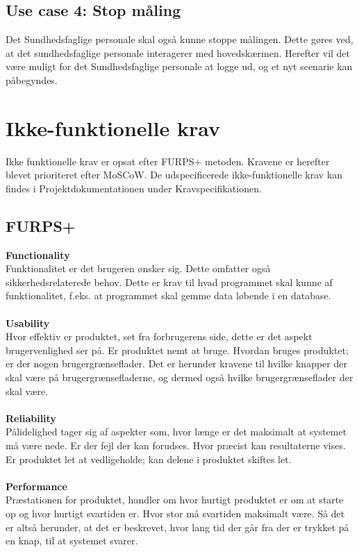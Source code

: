 \subsection{Use case 4: Stop måling}
Det Sundhedsfaglige personale skal også kunne stoppe målingen. Dette gøres ved, at det sundhedsfaglige personale interagerer med hovedskærmen. Herefter vil det være muligt for det Sundhedsfaglige personale at logge ud, og et nyt scenarie kan påbegyndes.
\section{Ikke-funktionelle krav}
Ikke funktionelle krav er opsat efter FURPS+ metoden. Kravene er herefter blevet prioriteret efter MoSCoW. De udspecificerede ikke-funktionelle krav kan findes i Projektdokumentationen under Kravspecifikationen.
\subsection{FURPS+}
\textbf{Functionality}\\
Funktionalitet er det brugeren ønsker sig. Dette omfatter også sikkerhedsrelaterede behov. Dette er krav til hvad programmet skal kunne af funktionalitet, f.eks. at programmet skal gemme data løbende i en database.\\\\
\textbf{Usability}\\
Hvor effektiv er produktet, set fra forbrugerens side, dette er det aspekt brugervenlighed ser på. Er produktet nemt at bruge. Hvordan bruges produktet; er der nogen brugergrænseflader. Det er herunder kravene til hvilke knapper der skal være på brugergrænsefladerne, og dermed også hvilke brugergrænseflader der skal være.\\\\
\textbf{Reliability}\\
Pålidelighed tager sig af aspekter som, hvor længe er det maksimalt at systemet må være nede. Er der fejl der kan forudses. Hvor præcist kan resultaterne vises. Er produktet let at vedligeholde; kan delene i produktet skiftes let.\\\\
\textbf{Performance}\\
Præstationen for produktet, handler om hvor hurtigt produktet er om at starte op og hvor hurtigt svartiden er. Hvor stor må svartiden maksimalt være. Så det er altså herunder, at det er beskrevet, hvor lang tid der går fra der er trykket på en knap, til at systemet svarer. \\\\
